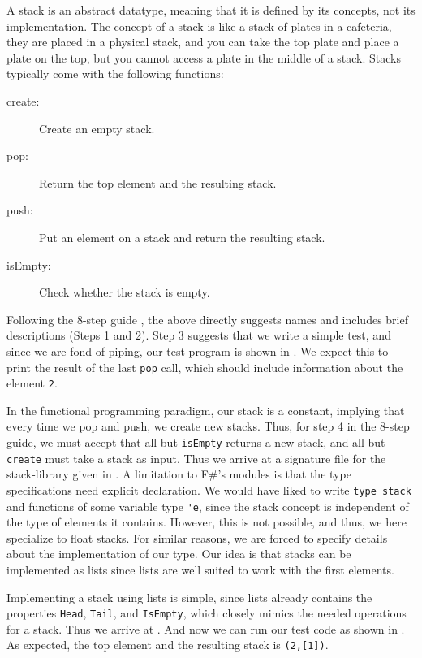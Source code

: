 \documentclass[fsharpNotes.tex]{subfiles}
\begin{document}
A stack is an abstract datatype, meaning that it is defined by its concepts, not its implementation. The concept of a stack is like a stack of plates in a cafeteria, they are placed in a physical stack, and you can take the top plate and place a plate on the top, but you cannot access a plate in the middle of a stack. Stacks typically come with the following functions:
\begin{description}
\item[create:] Create an empty stack.
\item[pop:] Return the top element and the resulting stack.
\item[push:] Put an element on a stack and return the resulting stack.
\item[isEmpty:] Check whether the stack is empty.
\end{description}
Following the 8-step guide , the above directly suggests names and includes brief descriptions (Steps 1 and 2). Step 3 suggests that we write a simple test, and
since we are fond of piping, our test program is shown in .
We expect this to print the result of the last \lstinline{pop} call, which should include information about the element \lstinline{2}.

In the functional programming paradigm, our stack is a constant, implying that every time we pop and push, we create new stacks. Thus, for step 4 in the 8-step guide, we must accept that all but \lstinline{isEmpty} returns a new stack, and all but \lstinline{create} must take a stack as input. Thus we arrive at a signature file for the stack-library given in .
A limitation to F\#'s modules is that the type specifications need explicit declaration. We would have liked to write \lstinline{type stack} and functions of some variable type \lstinline{'e}, since the stack concept is independent of the type of elements it contains. However, this is not possible, and thus, we here specialize to float stacks. For similar reasons, we are forced to specify details about the implementation of our type. Our idea is that stacks can be implemented as lists since lists are well suited to work with the first elements.

Implementing a stack using lists is simple, since lists already contains the properties \lstinline{Head}, \lstinline{Tail}, and \lstinline{IsEmpty}, which closely mimics the needed operations for a stack. Thus we arrive at .
And now we can run our test code as shown in .
As expected, the top element and the resulting stack is \lstinline{(2,[1])}.
\end{document}
